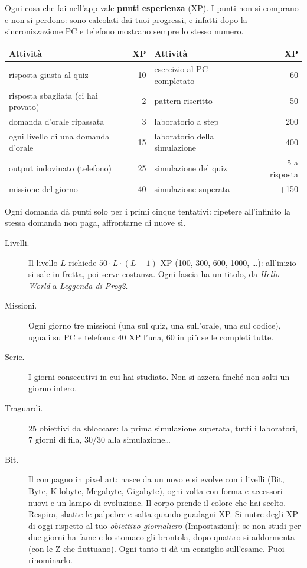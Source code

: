 Ogni cosa che fai nell'app vale \textbf{punti esperienza} (XP). I punti non si comprano e
non si perdono: sono calcolati dai tuoi progressi, e infatti dopo la sincronizzazione PC e
telefono mostrano sempre lo stesso numero.
\begin{center}\small
\begin{tabular}{lr@{\qquad}lr}
\toprule
\textbf{Attività} & \textbf{XP} & \textbf{Attività} & \textbf{XP} \\
\midrule
risposta giusta al quiz & 10 & esercizio al PC completato & 60 \\
risposta sbagliata (ci hai provato) & 2 & pattern riscritto & 50 \\
domanda d'orale ripassata & 3 & laboratorio a step & 200 \\
ogni livello di una domanda d'orale & 15 & laboratorio della simulazione & 400 \\
output indovinato (telefono) & 25 & simulazione del quiz & 5 a risposta \\
missione del giorno & 40 & simulazione superata & +150 \\
\bottomrule
\end{tabular}
\end{center}
Ogni domanda dà punti solo per i primi cinque tentativi: ripetere all'infinito la stessa
domanda non paga, affrontarne di nuove sì.

\begin{description}
  \item[Livelli.] Il livello $L$ richiede $50 \cdot L \cdot (L-1)$ XP (100, 300, 600,
        1000, \ldots): all'inizio si sale in fretta, poi serve costanza. Ogni fascia ha un
        titolo, da \emph{Hello World} a \emph{Leggenda di Prog2}.
  \item[Missioni.] Ogni giorno tre missioni (una sul quiz, una sull'orale, una sul
        codice), uguali su PC e telefono: 40 XP l'una, 60 in più se le completi tutte.
  \item[Serie.] I giorni consecutivi in cui hai studiato. Non si azzera finché non salti
        un giorno intero.
  \item[Traguardi.] 25 obiettivi da sbloccare: la prima simulazione superata, tutti i
        laboratori, 7 giorni di fila, 30/30 alla simulazione\ldots
  \item[Bit.] Il compagno in pixel art: nasce da un uovo e si evolve con i livelli (Bit,
        Byte, Kilobyte, Megabyte, Gigabyte), ogni volta con forma e accessori nuovi e un
        lampo di evoluzione. Il corpo prende il colore che hai scelto. Respira, sbatte le
        palpebre e salta quando guadagni XP. Si nutre degli XP di oggi rispetto al tuo
        \emph{obiettivo giornaliero} (Impostazioni): se non studi per due giorni ha fame
        e lo stomaco gli brontola, dopo quattro si addormenta (con le Z che fluttuano).
        Ogni tanto ti dà un consiglio sull'esame. Puoi rinominarlo.
\end{description}

